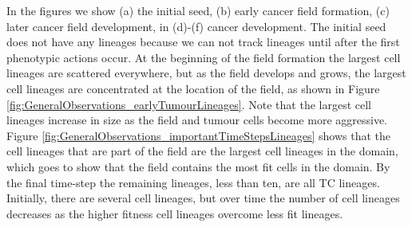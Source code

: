 \documentclass[\main/thesis.tex]{subfiles}
\begin{document}
In the figures we show (a) the initial seed, (b) early cancer field formation, (c) later cancer field development, in (d)-(f) cancer development. The initial seed does not have any lineages because we can not track lineages until after the first phenotypic actions occur. At the beginning of the field formation the largest cell lineages are scattered everywhere, but as the field develops and grows, the largest cell lineages are concentrated at the location of the field, as shown in Figure \ref{fig:GeneralObservations_earlyTumourLineages}. Note that the largest cell lineages increase in size as the field and tumour cells become more aggressive. Figure \ref{fig:GeneralObservations_importantTimeStepsLineages} shows that the cell lineages that are part of the field are the largest cell lineages in the domain, which goes to show that the field contains the most fit cells in the domain. By the final time-step the remaining lineages, less than ten, are all TC lineages. Initially, there are several cell lineages, but over time the number of cell lineages decreases as the higher fitness cell lineages overcome less fit lineages.
\end{document}
